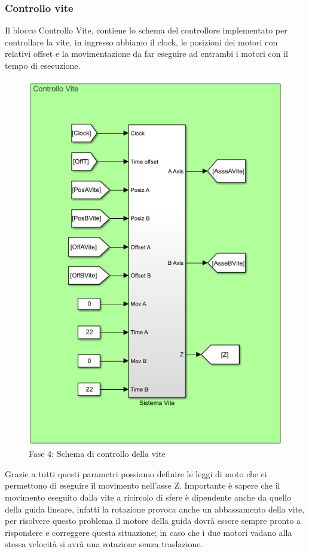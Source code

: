 \subsubsection*{Controllo vite}
Il blocco Controllo Vite, contiene lo schema del controllore implementato per controllare la vite, in ingresso abbiamo il clock, le posizioni dei motori con relativi offset e la movimentazione da far eseguire ad entrambi i motori con il tempo di esecuzione.
\begin{figure}[ht]
	\begin{center}
		\includegraphics[scale=0.7]{Immagini/Sperimentale/ControlloViteSchema}
		\caption{Fase 4: Schema di controllo della vite}
		\label{fig:ControlloVite}
	\end{center}
\end{figure}
Grazie a tutti questi parametri possiamo definire le leggi di moto che ci permettono di eseguire il movimento nell'asse Z. Importante è sapere che il movimento eseguito dalla vite a ricircolo di sfere è dipendente anche da quello della guida lineare, infatti la rotazione provoca anche un abbassamento della vite, per risolvere questo problema il motore della guida dovrà essere sempre pronto a rispondere e correggere questa situazione; in caso che i due motori vadano alla stessa velocità si avrà una rotazione senza traslazione.
